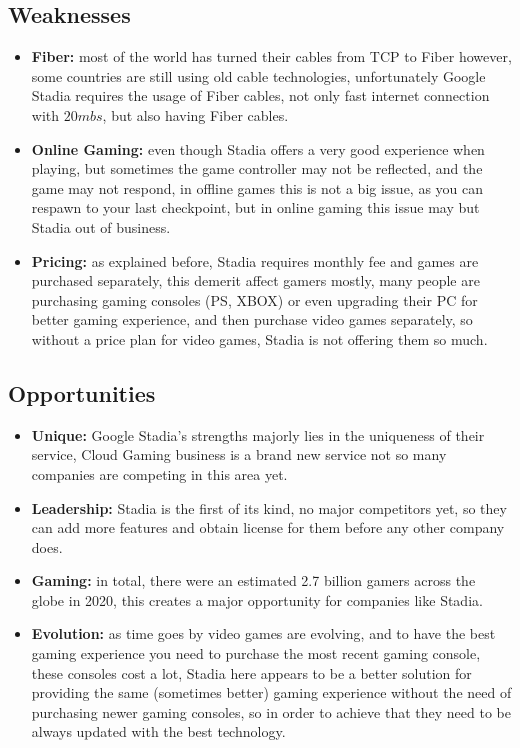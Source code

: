\subsection{Weaknesses}
\begin{itemize}    
    \item \textbf{Fiber:} 
        most of the world has turned their cables from TCP to Fiber however, some countries are still using
        old cable technologies, unfortunately Google Stadia requires the usage of Fiber cables,
        not only fast internet connection with $20mbs$, but also having Fiber cables.
    \item \textbf{Online Gaming:}
        even though Stadia offers a very good experience when playing, but sometimes the game controller
        may not be reflected, and the game may not respond, in offline games this is not a big issue, as you
        can respawn to your last checkpoint, but in online gaming this issue may but Stadia out of business.
    \item \textbf{Pricing:}
        as explained before, Stadia requires monthly fee and games are purchased separately, this demerit affect 
        gamers mostly, many people are purchasing gaming consoles (PS, XBOX) or even upgrading their PC for better gaming
        experience, and then purchase video games separately, so without a price plan for video games, Stadia is not
        offering them so much.
\end{itemize}

\subsection{Opportunities}
\begin{itemize}    
    \item \textbf{Unique:} 
        Google Stadia's strengths majorly lies in the uniqueness of their service,
        Cloud Gaming business is a brand new service not so many companies are competing in this
        area yet.

    \item \textbf{Leadership:}
        Stadia is the first of its kind, no major competitors yet, so they can add more features and obtain license for them
        before any other company does.
    
    \item \textbf{Gaming:}
        in total, there were an estimated 2.7 billion gamers across the globe in 2020, this creates a major opportunity
        for companies like Stadia.

    \item \textbf{Evolution:}
        as time goes by video games are evolving, and to have the best gaming experience you need to purchase the
        most recent gaming console, these consoles cost a lot, Stadia here appears to be a better solution
        for providing the same (sometimes better) gaming experience without the need of purchasing newer gaming
        consoles, so in order to achieve that they need to be always updated with the best technology.
\end{itemize}

